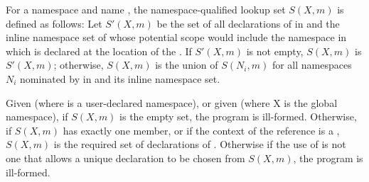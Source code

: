 \pnum
For a namespace  and name , the namespace-qualified lookup set
$S(X, m)$ is defined as follows: Let $S'(X, m)$ be the set of all
declarations of  in  and the inline namespace set of
whose potential scope
would include the namespace in which  is declared
at the location of the .
If $S'(X, m)$ is not empty, $S(X, m)$
is $S'(X, m)$; otherwise, $S(X, m)$ is the union of $S(N_i, m)$ for
all namespaces $N_i$ nominated by  in
 and its inline namespace set.

\pnum
Given  (where  is a user-declared namespace), or
given  (where X is the global namespace), if
$S(X, m)$ is the empty set, the program is ill-formed. Otherwise, if
$S(X, m)$ has exactly one member, or if the context of the reference is
a , $S(X, m)$
is the
required set of declarations of . Otherwise if the use of
 is not one that allows a unique declaration to be chosen from
$S(X, m)$, the program is ill-formed.
